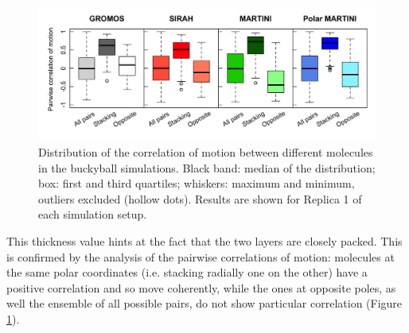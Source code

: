 \begin{figure}[p]
\centering
\includegraphics[width=0.95\linewidth]{3results_capsule/pics/RKGBcorr_boxplot_all.png} 
\caption[Correlation of motion between molecules of the buckyball]{Distribution of the correlation of motion between different molecules in the buckyball simulations. Black band: median of the distribution; box: first and third quartiles; whiskers: maximum and minimum, outliers excluded (hollow dots). Results are shown for Replica 1 of each simulation setup.}
\label{fig:BTI_corr}
\end{figure}
%
This thickness value hints at the fact that the two layers are closely packed. This is confirmed by the analysis of the pairwise correlations of motion:
%
molecules at the same polar coordinates (i.e. stacking radially one on the other) have a positive correlation and so move coherently, while the ones at opposite poles, as well the ensemble of all possible pairs, do not show particular correlation (Figure \ref{fig:BTI_corr}). 

